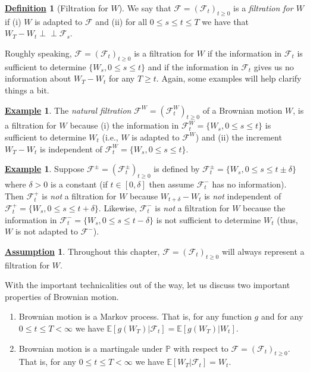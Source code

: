 \documentclass[12pt]{book}
\numberwithin{equation}{chapter}
\theoremstyle{plain}
\numberwithin{theorem}{section}
\theoremstyle{definition}
\newtheorem{definition}[theorem]{\underline{Definition}}
\newtheorem{example}[theorem]{\underline{Example}}
\newtheorem{assumption}[theorem]{\underline{Assumption}}
\numberwithin{exercise}{chapter}
\newcommand{\<}{\langle}
\renewcommand{\>}{\rangle}
\renewcommand{\(}{\left(}
\renewcommand{\)}{\right)}
\renewcommand{\[}{\left[}
\renewcommand{\]}{\right]}
\newcommand\Eb{\mathds{E}}
\newcommand\Pb{\mathds{P}}
\newcommand\Fc{\mathscr{F}}
\newcommand\del{\delta}
\newcommand{\ind}{\perp \! \! \! \perp}
\theoremstyle{definition}
\numberwithin{question}{section}
\begin{document}
\begin{definition}[Filtration for $W$]
We say that $\Fc = (\Fc_t)_{t \geq 0}$ is a \textit{filtration for $W$} if (i) $W$ is adapted to $\Fc$ and (ii) for all $0 \leq s \leq t \leq T$ we have that $W_T - W_t \ind \Fc_s$.
\end{definition}

\noindent
Roughly speaking, $\Fc = (\Fc_t)_{t \geq 0}$ is a filtration for $W$ if the information in $\Fc_t$ is sufficient to determine $\{ W_s, 0 \leq s \leq t\}$ and if the information in $\Fc_t$ gives us no information about $W_T - W_t$ for any $T \geq t$.  Again, some examples will help clarify things a bit.

\begin{example}
The \textit{natural filtration} $\Fc^W = (\Fc_t^W)_{t \geq 0}$ of a Brownian motion $W$, is a filtration for $W$ because (i) the information in $\Fc_t^W = \{ W_s, 0 \leq s \leq t\}$ is sufficient to determine $W_t$ (i.e., $W$ is adapted to $\Fc^W$) and (ii) the increment $W_T - W_t$ is independent of $\Fc_t^W = \{ W_s, 0 \leq s \leq t \}$.
\end{example}

\begin{example}
Suppose $\Fc^\pm = (\Fc_t^\pm)_{t \geq 0}$ is defined by $\Fc_t^\pm = \{ W_s, 0 \leq s \leq t \pm \del \}$ where $\del >0$ is a constant
(if $t \in [0,\del]$ then assume $\Fc_t^-$ has no information).
Then $\Fc_t^+$ is \textit{not} a filtration for $W$ because $W_{t+\del} - W_t$ is \textit{not} independent of $\Fc_t^+ = \{ W_s , 0 \leq s \leq t+\del\}$.  Likewise, $\Fc_t^-$ is \textit{not} a filtration for $W$ because the information in $\Fc_t^- = \{ W_s, 0 \leq s \leq t-\del \}$ is not sufficient to determine $W_t$ (thus, $W$ is not adapted to $\Fc^-$).
\end{example}

\begin{assumption}
Throughout this chapter, $\Fc = (\Fc_t)_{t \geq 0}$ will always represent a filtration for $W$.
\end{assumption}

\noindent
With the important technicalities out of the way, let us discuss two important properties of Brownian motion.
\begin{enumerate}
\item  Brownian motion is a Markov process.  That is, for any function $g$ and for any $0 \leq t \leq T < \infty$ we have $\Eb [ g(W_T) | \Fc_t] = \Eb [ g(W_T) | W_t]$.
\item Brownian motion is a martingale under $\Pb$ with respect to $\Fc = (\Fc_t)_{t \geq 0}$.  That is, for any $0 \leq t \leq T < \infty$ we have $\Eb [W_T | \Fc_t]  = W_t$.
\end{enumerate}
\end{document}
